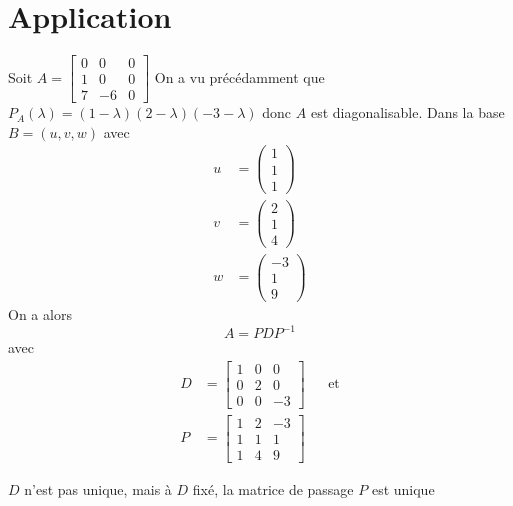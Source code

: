 \documentclass[11pt,colorlinks]{book}
\theoremstyle{mytheoremstyle}
\theoremstyle{mytheoremstyle}
\theoremstyle{mytheoremstyle}
\theoremstyle{mytheoremstyle}
\theoremstyle{mytheoremstyle}
\theoremstyle{mytheoremstyle}
\theoremstyle{mytheoremstyle}
\theoremstyle{mytheoremstyle}
\theoremstyle{myproblemstyle}
\begin{document}
\section{Application}
\begin{ex}
  Soit $A = \begin{bmatrix}
    0 & 0 & 0 \\ 
    1 & 0 & 0 \\ 
    7 & -6 & 0
  \end{bmatrix}$ 
  On a vu précédamment que $P_{A}(\lambda) = (1-\lambda)(2-\lambda)(-3-\lambda)$ donc $A$ est diagonalisable. Dans la base 
  $B = (u,v,w)$ avec 
  \begin{align*}
    u &= \begin{pmatrix}
      1 \\ 
      1 \\ 
      1
    \end{pmatrix} \\ 
    v &= \begin{pmatrix}
      2 \\ 
      1 \\ 
      4
    \end{pmatrix} \\ 
    w &= \begin{pmatrix}
      -3 \\
      1 \\
      9
    \end{pmatrix}
  \end{align*}
  On a alors 
  \begin{equation*}
    A = PDP^{-1}
  \end{equation*}
  avec 
  \begin{align*}
    D &= \begin{bmatrix}
      1 & 0 & 0 \\ 
      0 & 2 & 0 \\ 
      0 & 0 & -3
    \end{bmatrix} && \text{et} \\ 
    P &= \begin{bmatrix}
      1 & 2 & -3 \\ 
      1 & 1 & 1 \\ 
      1 & 4 & 9
    \end{bmatrix}
  \end{align*}
\end{ex}
\begin{rmq}
  $D$ n'est pas unique, mais à $D$ fixé, la matrice de passage $P$ est unique
\end{rmq}
\end{document}

